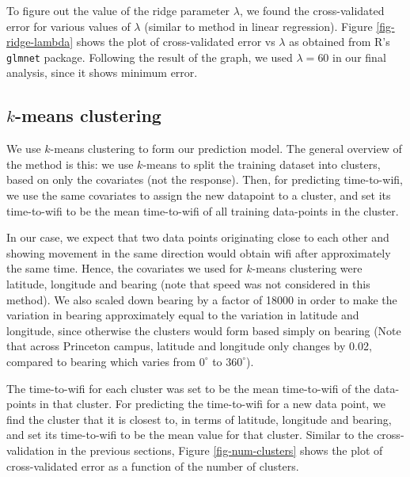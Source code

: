 \documentclass[12pt, fleqn]{article}
\begin{document}
To figure out the value of the ridge parameter $\lambda$, we found the cross-validated error
for various values of $\lambda$ (similar to method in linear regression). 
Figure \ref{fig-ridge-lambda} shows the plot of 
cross-validated error vs $\lambda$ as obtained from R’s \texttt{glmnet} package. Following the result of 
the graph, we used $\lambda = 60$ in our final analysis, since it shows minimum 
error. 

\subsection{$k$-means clustering}
\label{time-to-wifi-kmeans}

We use $k$-means clustering to form our prediction model. The general overview of the method is this:
we use $k$-means to split the training dataset into clusters, based on only the covariates 
(not the response). Then, for predicting time-to-wifi, we use the same covariates to assign 
the new datapoint to a cluster, and set its time-to-wifi to be the mean 
time-to-wifi of all training data-points in the cluster.

In our case, we expect that two data points originating close 
to each other and showing movement in the same direction would obtain wifi after 
approximately the same time. Hence, the covariates we used for $k$-means 
clustering were latitude, longitude and bearing (note that speed was not 
considered in this method). We also scaled down bearing by a factor of 18000 in 
order to make the variation in bearing approximately equal to the variation in latitude 
and longitude, since otherwise the clusters would form based simply on bearing (Note that 
across Princeton campus, latitude and longitude only changes by 0.02, compared 
to bearing which varies from $0^\circ$ to $360^\circ$). 

The time-to-wifi for each cluster was set to be the mean time-to-wifi of the data-points in 
that cluster. For predicting the time-to-wifi for a new data point, we find the cluster that it is
closest to, in terms of latitude, longitude and bearing, and set its 
time-to-wifi to be the mean value for that cluster. Similar to the cross-validation
in the previous sections, Figure \ref{fig-num-clusters} shows the plot of 
cross-validated error as a function of the number of clusters. 
\end{document}
